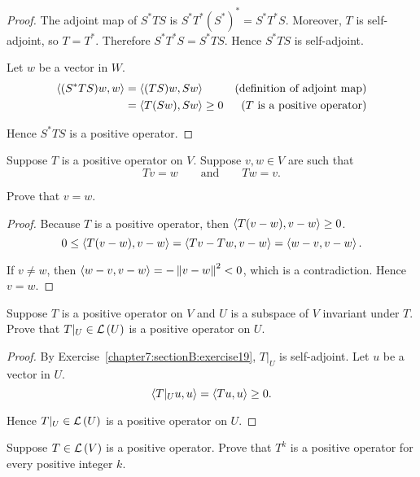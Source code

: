 \begin{proof}
    The adjoint map of $S^{*}TS$ is $S^{*}T^{*}{(S^{*})}^{*} = S^{*}T^{*}S$. Moreover, $T$ is self-adjoint, so $T = T^{*}$. Therefore $S^{*}T^{*}S = S^{*}TS$. Hence $S^{*}TS$ is self-adjoint.

    Let $w$ be a vector in $W$.
    \begin{align*}
        \left\langle{(S^{*}TS)w, w}\right\rangle & = \left\langle{(TS)w, Sw}\right\rangle        & \text{(definition of adjoint map)}  \\
                                  & = \left\langle{T(Sw), Sw}\right\rangle \geq 0 & \text{($T$ is a positive operator)}
    \end{align*}

    Hence $S^{*}TS$ is a positive operator.
\end{proof}
\newpage

\begin{exercise}
    Suppose $T$ is a positive operator on $V$. Suppose $v, w \in V$ are such that
    \[
        Tv = w \qquad\text{and}\qquad Tw = v.
    \]

    Prove that $v = w$.
\end{exercise}

\begin{proof}
    Because $T$ is a positive operator, then $\left\langle{T(v - w), v - w}\right\rangle\geq 0$.
    \[
        0\leq \left\langle{T(v - w), v - w}\right\rangle = \left\langle{Tv - Tw, v - w}\right\rangle = \left\langle{w - v, v - w}\right\rangle.
    \]

    If $v\ne w$, then $\left\langle{w - v, v - w}\right\rangle = -\left\Vert{v - w}\right\Vert^{2} < 0$, which is a contradiction. Hence $v = w$.
\end{proof}
\newpage

\begin{exercise}
    Suppose $T$ is a positive operator on $V$ and $U$ is a subspace of $V$ invariant under $T$. Prove that $T\vert_{U} \in \mathcal{L}\left({U}\right)$ is a positive operator on $U$.
\end{exercise}

\begin{proof}
    By Exercise~\ref{chapter7:sectionB:exercise19}, $T\vert_{U}$ is self-adjoint. Let $u$ be a vector in $U$.
    \[
        \left\langle{T\vert_{U}u, u}\right\rangle = \left\langle{Tu, u}\right\rangle\geq 0.
    \]

    Hence $T\vert_{U}\in\mathcal{L}\left({U}\right)$ is a positive operator on $U$.
\end{proof}
\newpage

\begin{exercise}
    Suppose $T\in\mathcal{L}\left({V}\right)$ is a positive operator. Prove that $T^{k}$ is a positive operator for every positive integer $k$.
\end{exercise}

